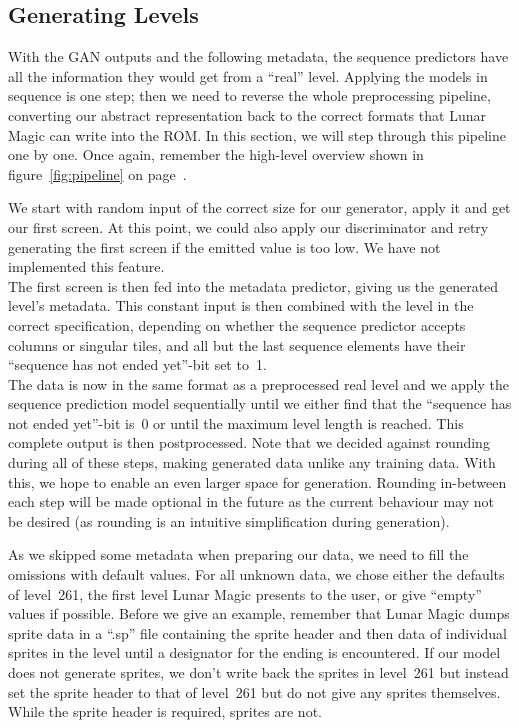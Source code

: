 \subsection{Generating Levels}
\label{sec:generating-levels}

With the GAN outputs and the following metadata, the sequence
predictors have all the information they would get from a ``real''
level. Applying the models in sequence is one step; then we need to
reverse the whole preprocessing pipeline, converting our abstract
representation back to the correct formats that Lunar Magic can write
into the ROM. In this section, we will step through this pipeline one
by one. Once again, remember the high-level overview shown in
figure~\ref{fig:pipeline} on page~\pageref{fig:pipeline}.

We start with random input of the correct size for our generator,
apply it and get our first screen. At this point, we could also apply
our discriminator and retry generating the first screen if the emitted
value is too low. We have not implemented this feature. \\
The first screen is then fed into the metadata predictor, giving us
the generated level's metadata. This constant input is then combined
with the level in the correct specification, depending on whether the
sequence predictor accepts columns or singular tiles, and all but the
last sequence elements have their ``sequence has not ended yet''-bit
set to~1. \\
The data is now in the same format as a preprocessed real level and we
apply the sequence prediction model sequentially until we either find
that the ``sequence has not ended yet''-bit is~0 or until the maximum
level length is reached. This complete output is then postprocessed.
Note that we decided against rounding during all of these steps,
making generated data unlike any training data. With this, we hope to
enable an even larger space for generation. Rounding in-between each
step will be made optional in the future as the current behaviour may
not be desired (as rounding is an intuitive simplification during
generation).

As we skipped some metadata when preparing our data, we need to fill
the omissions with default values. For all unknown data, we chose
either the defaults of level~261, the first level Lunar Magic presents
to the user, or give ``empty'' values if possible. Before we give an
example, remember that Lunar Magic dumps sprite data in a ``.sp'' file
containing the sprite header and then data of individual sprites in
the level until a designator for the ending is encountered. If our
model does not generate sprites, we don't write back the sprites in
level~261 but instead set the sprite header to that of level~261 but
do not give any sprites themselves. While the sprite header is
required, sprites are not.

